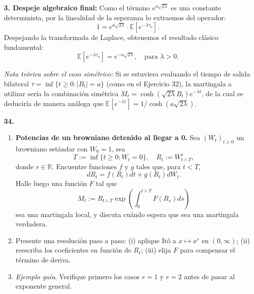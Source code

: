 \documentclass[11pt, letterpaper]{article}
\begin{document}
\begin{solucion}
    \textbf{3. Despeje algebraico final:}
    Como el término $e^{a\sqrt{2\lambda}}$ es una constante determinista, por la linealidad de la esperanza lo extraemos del operador:
    \[ 1 = e^{a\sqrt{2\lambda}} \cdot \mathbb{E}\left[ e^{-\lambda \tau_a} \right]. \]
    Despejando la transformada de Laplace, obtenemos el resultado clásico fundamental:
    \[ \mathbb{E}[e^{-\lambda \tau_a}] = e^{-a\sqrt{2\lambda}}, \quad \text{para } \lambda > 0. \]

    \vspace{2mm}
    \textit{Nota teórica sobre el caso simétrico:} Si se estuviera evaluando el tiempo de salida bilateral $\tau = \inf\{t \ge 0 : |B_t| = a\}$ (como en el Ejercicio 32), la martingala a utilizar sería la combinación simétrica $M_t = \cosh(\sqrt{2\lambda}B_t)e^{-\lambda t}$, de la cual se deduciría de manera análoga que $\mathbb{E}[e^{-\lambda \tau}] = 1 / \cosh(a\sqrt{2\lambda})$.
\end{solucion}

\newpage

\begin{ejercicio}
    \textbf{34.} 
    \begin{enumerate}
        \item \textbf{Potencias de un browniano detenido al llegar a 0.} Sea $(W_t)_{t \ge 0}$ un browniano estándar con $W_0 = 1$, sea
        \[ T := \inf\{t \ge 0 : W_t = 0\}, \quad R_t := W_{t \wedge T}^r, \]
        donde $r \in \mathbb{R}$. Encuentre funciones $f$ y $g$ tales que, para $t < T$,
        \[ dR_t = f(R_t) dt + g(R_t) dW_t. \]
        Halle luego una función $F$ tal que
        \[ M_t := R_{t \wedge T} \exp\left( \int_0^{t \wedge T} F(R_s) ds \right) \]
        sea una martingala local, y discuta cuándo espera que sea una martingala verdadera.
        \item Presente una resolución paso a paso: (i) aplique Itô a $x \mapsto x^r$ en $(0, \infty)$; (ii) reescriba los coeficientes en función de $R_t$; (iii) elija $F$ para compensar el término de deriva.
        \item \textit{Ejemplo guía}. Verifique primero los casos $r = 1$ y $r = 2$ antes de pasar al exponente general.
    \end{enumerate}
\end{ejercicio}

\vspace{5mm}
\end{document}

